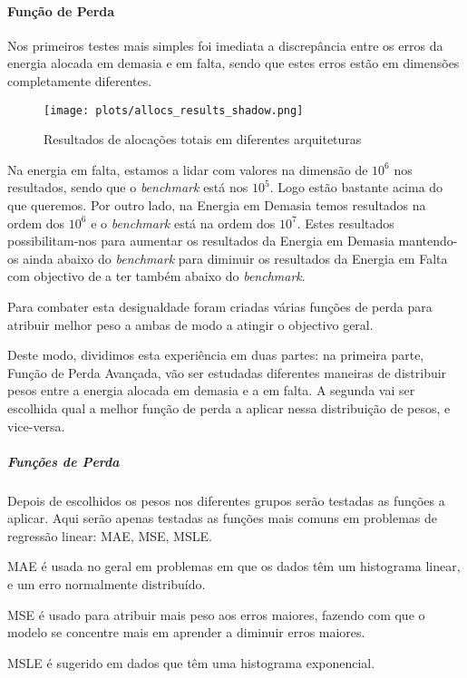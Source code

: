 \paragraph{Função de Perda}
\text{ }  \par

Nos primeiros testes mais simples foi imediata a discrepância entre os erros da energia alocada em demasia e em falta, sendo que estes erros estão em dimensões completamente diferentes.
\begin{figure}[H]
    \centering
    \texttt{[image: plots/allocs\_results\_shadow.png]}
    \caption{Resultados de alocações totais em diferentes arquiteturas}
    \label{fig:resexparchs}
  \end{figure}

Na energia em falta, estamos a lidar com valores na dimensão de $10^{6}$ nos resultados, sendo que o \textit{benchmark} está nos $10^{5}$. Logo estão bastante acima do que queremos. Por outro lado, na Energia em Demasia temos resultados na ordem dos $10^{6}$ e o \textit{benchmark} está na ordem dos $10^{7}$. Estes resultados possibilitam-nos para aumentar os resultados da Energia em Demasia mantendo-os ainda abaixo do \textit{benchmark} para diminuir os resultados da Energia em Falta com objectivo de a ter também abaixo do \textit{benchmark}.\par
Para combater esta desigualdade foram criadas várias funções de perda para atribuir melhor peso a ambas de modo a atingir o objectivo geral.\par
Deste modo, dividimos esta experiência em duas partes: na primeira parte, Função de Perda Avançada, vão ser estudadas diferentes maneiras de distribuir pesos entre a energia alocada em demasia e a em falta. A segunda vai ser escolhida qual a melhor função de perda a aplicar nessa distribuição de pesos, e vice-versa.\par


\subparagraph{Funções de Perda}
\text{ }  \par
Depois de escolhidos os pesos nos diferentes grupos serão testadas as funções a aplicar. Aqui serão apenas testadas as funções mais comuns em problemas de regressão linear: \gls{MAE}, \gls{MSE}, \gls{MSLE}.\par
\gls{MAE} é usada no geral em problemas em que os dados têm um histograma linear, e um erro normalmente distribuído.\par
\gls{MSE} é usado para atribuir mais peso aos erros maiores, fazendo com que o modelo se concentre mais em aprender a diminuir erros maiores.\par
\gls{MSLE} é sugerido em dados que têm uma histograma exponencial.\par

